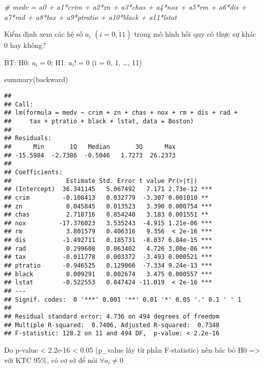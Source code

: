\documentclass[
]{article}
\newenvironment{Shaded}{\begin{snugshade}}{\end{snugshade}}
\newcommand{\CommentTok}[1]{\textcolor[rgb]{0.56,0.35,0.01}{\textit{#1}}}
\newcommand{\FunctionTok}[1]{\textcolor[rgb]{0.00,0.00,0.00}{#1}}
\newcommand{\NormalTok}[1]{#1}
\begin{document}
\begin{Shaded}
\begin{Highlighting}[]
\CommentTok{\# medv = a0 + a1*crim + a2*zn + a3*chas + a4*nox + a5*rm + a6*dis + a7*rad + a8*tax + a9*ptratio + a10*black + a11*lstat}
\end{Highlighting}
\end{Shaded}

Kiểm định xem các hệ số \(a_i\) \((i=\overline{0, 11})\) trong mô hình
hồi quy có thực sự khác 0 hay không?

BT: H0: \(a_i = 0\); H1: \(a_i != 0\) (i = 0, 1, \ldots, 11)

\begin{Shaded}
\begin{Highlighting}[]
\FunctionTok{summary}\NormalTok{(backward)}
\end{Highlighting}
\end{Shaded}

\begin{verbatim}
## 
## Call:
## lm(formula = medv ~ crim + zn + chas + nox + rm + dis + rad + 
##     tax + ptratio + black + lstat, data = Boston)
## 
## Residuals:
##      Min       1Q   Median       3Q      Max 
## -15.5984  -2.7386  -0.5046   1.7273  26.2373 
## 
## Coefficients:
##               Estimate Std. Error t value Pr(>|t|)    
## (Intercept)  36.341145   5.067492   7.171 2.73e-12 ***
## crim         -0.108413   0.032779  -3.307 0.001010 ** 
## zn            0.045845   0.013523   3.390 0.000754 ***
## chas          2.718716   0.854240   3.183 0.001551 ** 
## nox         -17.376023   3.535243  -4.915 1.21e-06 ***
## rm            3.801579   0.406316   9.356  < 2e-16 ***
## dis          -1.492711   0.185731  -8.037 6.84e-15 ***
## rad           0.299608   0.063402   4.726 3.00e-06 ***
## tax          -0.011778   0.003372  -3.493 0.000521 ***
## ptratio      -0.946525   0.129066  -7.334 9.24e-13 ***
## black         0.009291   0.002674   3.475 0.000557 ***
## lstat        -0.522553   0.047424 -11.019  < 2e-16 ***
## ---
## Signif. codes:  0 '***' 0.001 '**' 0.01 '*' 0.05 '.' 0.1 ' ' 1
## 
## Residual standard error: 4.736 on 494 degrees of freedom
## Multiple R-squared:  0.7406, Adjusted R-squared:  0.7348 
## F-statistic: 128.2 on 11 and 494 DF,  p-value: < 2.2e-16
\end{verbatim}

Do p-value \textless{} 2.2e-16 \textless{} 0.05 (p\_value lấy từ phần
F-statistic) nên bác bỏ H0 =\textgreater{} với KTC 95\%, có cơ sở để nói
\(\forall a_i \ne 0\)
\end{document}
